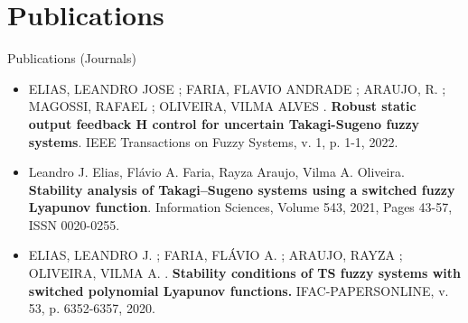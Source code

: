 
	



\section{Publications}
\begin{frame}{Publications (Journals)}
	\begin{itemize}
		\item ELIAS, LEANDRO JOSE ; FARIA, FLAVIO ANDRADE ; ARAUJO, R. ; MAGOSSI, RAFAEL ; OLIVEIRA, VILMA ALVES . \textbf{Robust static output feedback H control for uncertain Takagi-Sugeno fuzzy systems}. IEEE Transactions on Fuzzy Systems, v. 1, p. 1-1, 2022. 
		\item Leandro J. Elias, Flávio A. Faria, Rayza Araujo, Vilma A. Oliveira. \textbf{Stability analysis of Takagi–Sugeno systems using a switched fuzzy Lyapunov function}. Information Sciences, Volume 543, 2021, Pages 43-57, ISSN 0020-0255.
		
		\item ELIAS, LEANDRO J. ; FARIA, FLÁVIO A. ; ARAUJO, RAYZA ; OLIVEIRA, VILMA A. . \textbf{Stability conditions of TS fuzzy systems with switched polynomial Lyapunov functions.} IFAC-PAPERSONLINE, v. 53, p. 6352-6357, 2020.
	\end{itemize}
\end{frame}

